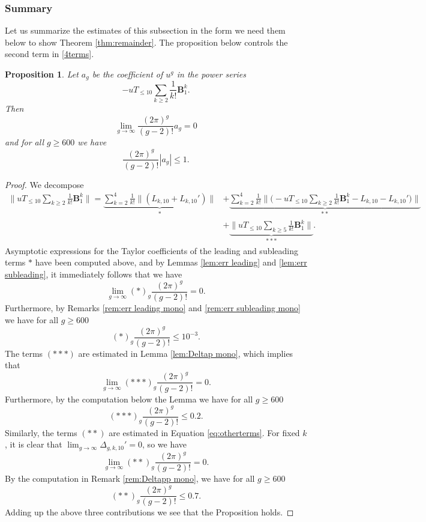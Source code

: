 \documentclass[12pt]{amsart}
\newtheorem{prop}[thm]{Proposition}
\theoremstyle{definition}
\numberwithin{equation}{section}
\newcommand{\bB}{\mathbf{B}}
\theoremstyle{definition} %
\theoremstyle{remark}
\begin{document}
\subsubsection{Summary}
Let us summarize the estimates of this subsection in the form we need them below to show Theorem \ref{thm:remainder}. The proposition below controls the second term in \eqref{4terms}. 
\begin{prop}\label{prop:B1s alone}
Let $a_g$ be the coefficient of $u^g$ in the power series 
\[
-u T_{\leq 10} \sum_{k\geq 2} \frac 1{k!} \bB_1^k.
\]
Then 
\[
\lim_{g\to \infty} \frac{(2\pi)^g }{(g-2)!} a_g =0
\]
and for all $g\geq 600$ we have 
\[
    \frac{(2\pi)^g }{(g-2)!} |a_g| \leq 1.
\]
\end{prop}
\begin{proof}
We decompose 
\begin{align*}
    \Big\|u T_{\leq 10} \sum_{k\geq 2} \frac 1{k!} \bB_1^k\Big\|
    =
    \underbrace{\sum_{k=2}^4 \frac1{k!} \|(L_{k,10} +L_{k,10}')\|}_{*}
    &+ 
    \underbrace{\sum_{k=2}^4 \frac1{k!} \Big\|\Big(-u T_{\leq 10} \sum_{k\geq 2} \frac 1{k!} \bB_1^k- L_{k,10} -L_{k,10}'\Big)\Big\|}_{**} \\
    &
    +
    \underbrace{
        \Big\|u T_{\leq 10} \sum_{k\geq 5} \frac 1{k!} \bB_1^k\Big\|
    }_{***}.
\end{align*}
Asymptotic expressions for the Taylor coefficients of the leading and subleading terms $*$ have been computed above, and by Lemmas \ref{lem:err leading} and \ref{lem:err subleading}, it immediately follows that we have 
\[
\lim_{g\to\infty} (*)_g \frac{(2\pi)^g}{(g-2)!} =0.
\]
Furthermore, by Remarks \ref{rem:err leading mono} and \ref{rem:err subleading mono} we have for all $g\geq 600$
\[
    (*)_g \frac{(2\pi)^g}{(g-2)!} \leq 10^{-3}.
\]
The terms $(***)$ are estimated in Lemma \ref{lem:Deltap mono}, 
which implies that 
\[
    \lim_{g\to\infty} (***)_g \frac{(2\pi)^g}{(g-2)!} =0.
\] 
Furthermore, by the computation below the Lemma we have for all $g\geq 600$
\[
    (***)_g \frac{(2\pi)^g}{(g-2)!} \leq 0.2.
\]
Similarly, the terms $(**)$ are estimated in Equation \eqref{eq:otherterms}. For fixed $k$, it is clear that $\lim_{g \to \infty}\Delta_{g,k,10}' = 0$, so we have
\[
    \lim_{g\to\infty} (**)_g \frac{(2\pi)^g}{(g-2)!} =0.
\] 
By the computation in Remark \ref{rem:Deltapp mono}, we have for all $g \geq 600$
\[
    (**)_g \frac{(2\pi)^g}{(g-2)!} \leq 0.7.
\]
Adding up the above three contributions we see that the Proposition holds.
\end{proof}
\end{document}
